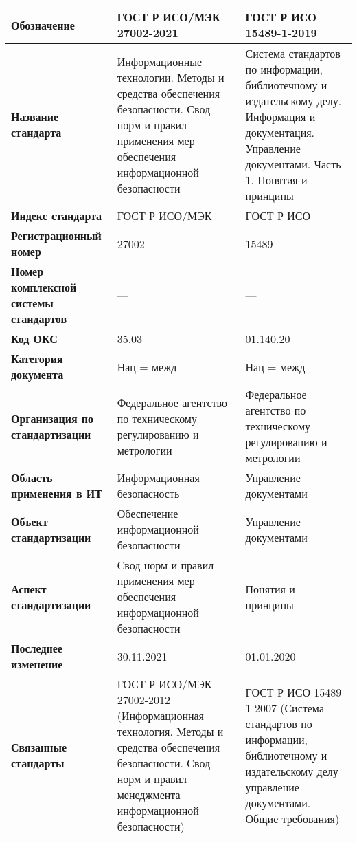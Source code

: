\begin{table}[h!tp]
	\centering
	\caption{}
	\label{table:national:international}
	\begin{tabular}{|p{10em}|p{12em}|p{12em}|}
		\hline
		\textbf{Обозначение}
			& \textbf{ГОСТ Р ИСО/МЭК 27002-2021}
			& \textbf{ГОСТ Р ИСО 15489-1-2019} \\ \hline
		\textbf{Название стандарта}
			& Информационные технологии. Методы и средства обеспечения безопасности. Свод норм и правил применения мер обеспечения информационной безопасности
			& Система стандартов по информации, библиотечному и издательскому делу. Информация и документация. Управление документами. Часть 1. Понятия и принципы \\ \hline
		\textbf{Индекс стандарта}
			& ГОСТ Р ИСО/МЭК & ГОСТ Р ИСО \\ \hline
		\textbf{Регистрационный номер}
			& 27002 & 15489 \\ \hline
		\textbf{Номер комплексной системы стандартов}
			& --- & --- \\ \hline
		\textbf{Код ОКС}
			& 35.03 & 01.140.20 \\ \hline
		\textbf{Категория документа}
			& Нац = межд & Нац = межд \\ \hline
		\textbf{Организация по стандартизации}
			& Федеральное агентство по техническому регулированию и метрологии
			& Федеральное агентство по техническому регулированию и метрологии \\ \hline
		\textbf{Область применения в ИТ}
			& Информационная безопасность & Управление документами \\ \hline
		\textbf{Объект стандартизации}
			& Обеспечение информационной безопасности
			& Управление документами \\ \hline
		\textbf{Аспект стандартизации}
			& Свод норм и правил применения мер обеспечения информационной безопасности
			& Понятия и принципы \\ \hline
		\textbf{Последнее изменение}
			& 30.11.2021 & 01.01.2020 \\ \hline
		\textbf{Связанные стандарты}
			& ГОСТ Р ИСО/МЭК 27002-2012 (Информационная технология.
			Методы и средства обеспечения безопасности.
			Свод норм и правил менеджмента информационной безопасности)
			& ГОСТ Р ИСО 15489-1-2007 (Система стандартов по информации,
			библиотечному и издательскому делу управление документами.
			Общие требования) \\ \hline
	\end{tabular}
\end{table}

